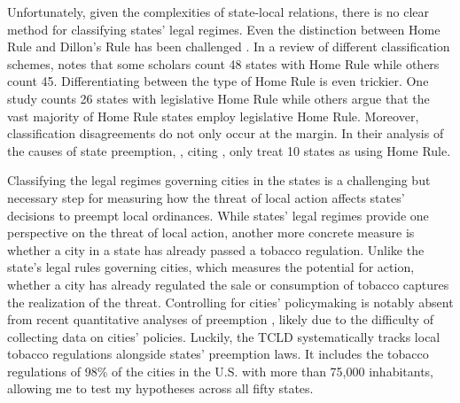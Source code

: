 \documentclass[12pt]{article}
\begin{document}
Unfortunately, given the complexities of state-local relations, there is no clear method for classifying states' legal regimes. Even the distinction between Home Rule and Dillon's Rule has been challenged \parencite{richardsonDillonRuleMars2011}. In a review of different classification schemes, \textcite{dillerIntrastatePreemption2007} notes that some scholars count 48 states with Home Rule while others count 45. Differentiating between the type of Home Rule is even trickier. One study counts 26 states with legislative Home Rule while others argue that the vast majority of Home Rule states employ legislative Home Rule. Moreover, classification disagreements do not only occur at the margin. In their analysis of the causes of state preemption, \textcite{fowlerStatePreemptionLocal2019}, citing \textcite{kraneHomeRuleAmerica2000}, only treat 10 states as using Home Rule. 

Classifying the legal regimes governing cities in the states is a challenging but necessary step for measuring how the threat of local action affects states' decisions to preempt local ordinances. While states' legal regimes provide one perspective on the threat of local action, another more concrete measure is whether a city in a state has already passed a tobacco regulation. Unlike the state's legal rules governing cities, which measures the potential for action, whether a city has already regulated the sale or consumption of tobacco captures the realization of the threat. Controlling for cities' policymaking is notably absent from recent quantitative analyses of preemption \parencite{fowlerStatePreemptionLocal2019,goodmanStateLegislativeIdeology2019,flavinExplainingStatePreemption2019}, likely due to the difficulty of collecting data on cities' policies. Luckily, the TCLD systematically tracks local tobacco regulations alongside states' preemption laws. It includes the tobacco regulations of 98\% of the cities in the U.S. with more than 75,000 inhabitants, allowing me to test my hypotheses across all fifty states.
\end{document}
